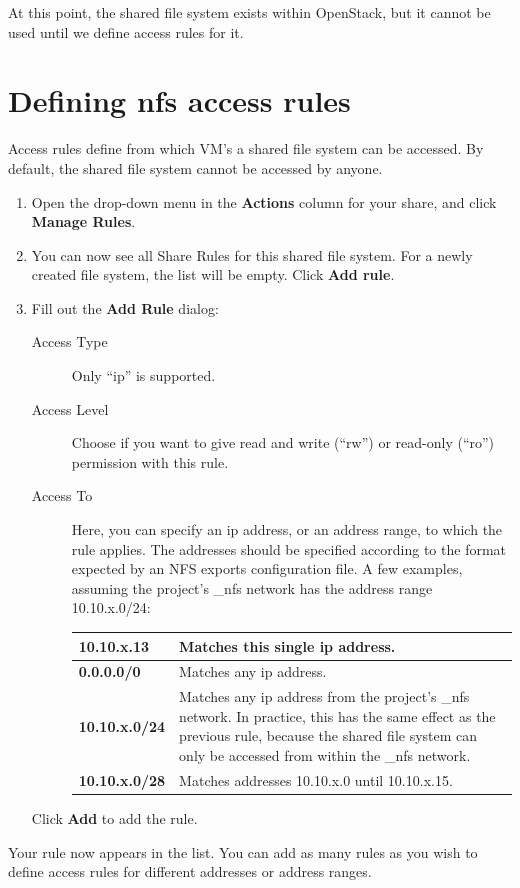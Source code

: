 At this point, the shared file system exists within OpenStack, but it cannot be used until we define access rules for it.

\section*{Defining \gls{nfs} access rules}\label{sec:defin-nfs-access}
Access rules define from which VM's a shared file system can be accessed.  By default, the shared file system cannot be accessed by anyone.

\begin{enumerate}
\item Open the drop-down menu in the \textbf{Actions} column for your share, and click \textbf{Manage Rules}.
\item You can now see all Share Rules for this shared file system.
  For a newly created file system, the list will be empty.  Click \textbf{Add rule}.
\item Fill out the \textbf{Add Rule} dialog:
  \begin{description}
  \item[Access Type] Only ``ip'' is supported.
  \item[Access Level] Choose if you want to give read and write
    (``rw'') or read-only (``ro'') permission with this rule.
  \item[Access To] Here, you can specify an ip address, or an address range, to which the rule applies.  The addresses should be specified according to the format expected by an NFS exports configuration file.  A few examples, assuming the project's \_nfs network has the address range 10.10.x.0/24:

    \begin{tabular}{>{\bfseries}lp{}}
      10.10.x.13 & Matches this single ip address.
      \\ \hline
      0.0.0.0/0 & Matches any ip address.
      \\ \hline
      10.10.x.0/24 & Matches any ip address from the project's \_nfs network.  In practice, this has the same effect as the previous rule, because the shared file system can only be accessed from within the \_nfs network.
      \\ \hline 
      10.10.x.0/28 & Matches addresses 10.10.x.0 until 10.10.x.15.
      \\
    \end{tabular}

  \end{description}
  Click \textbf{Add} to add the rule.
\end{enumerate}
Your rule now appears in the list.  You can add as many rules as you wish to define access rules for different addresses or address ranges.

